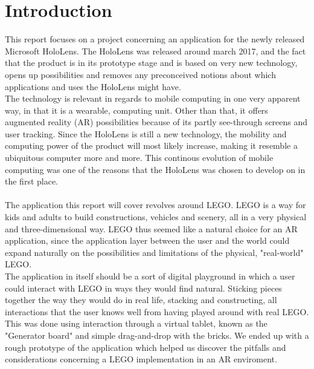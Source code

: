 
\section{Introduction}
This report focuses on a project concerning an application for the newly released Microsoft HoloLens. The HoloLens was released around march 2017, and the fact that the product is in its prototype stage and is based on very new technology, opens up possibilities and removes any preconceived notions about which applications and uses the HoloLens might have.\\
The technology is relevant in regards to mobile computing in one very apparent way, in that it is a wearable, computing unit. Other than that, it offers augmented reality (AR) possibilities because of its partly see-through screens and user tracking. Since the HoloLens is still a new technology, the mobility and computing power of the product will most likely increase, making it resemble a ubiquitous computer more and more. This continous evolution of mobile computing was one of the reasons that the HoloLens was chosen to develop on in the first place.\\\\
The application this report will cover revolves around LEGO. LEGO is a way for kids and adults to build constructions, vehicles and scenery, all in a very physical and three-dimensional way. LEGO thus seemed like a natural choice for an AR application, since the application layer between the user and the world could expand naturally on the possibilities and limitations of the physical, "real-world" LEGO.\\
The application in itself should be a sort of digital playground in which a user could interact with LEGO in ways they would find natural. Sticking pieces together the way they would do in real life, stacking and constructing, all interactions that the user knows well from having played around with real LEGO. This was done using interaction through a virtual tablet, known as the "Generator board" and simple drag-and-drop with the bricks. We ended up with a rough prototype of the application which helped us discover the pitfalls and considerations concerning a LEGO implementation in an AR enviroment.